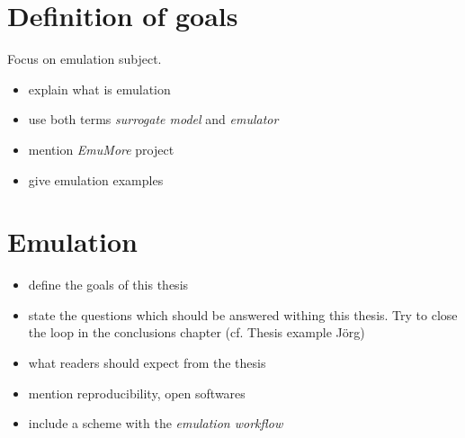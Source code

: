 \section{Definition of goals}

Focus on emulation subject.

\begin{itemize}
\itemsep0em
  \item explain what is emulation
  \item use both terms \textit{surrogate model} and \textit{emulator}
  \item mention \textit{EmuMore} project
  \item give emulation examples
\end{itemize}


\section{Emulation}

\begin{itemize}
\itemsep0em
  \item define the goals of this thesis
  \item state the questions which should be answered withing this thesis. Try to close the loop in the conclusions chapter (cf. Thesis example Jörg)
  \item what readers should expect from the thesis
  \item mention reproducibility, open softwares
  \item include a scheme with the \emph{emulation workflow}
\end{itemize}








